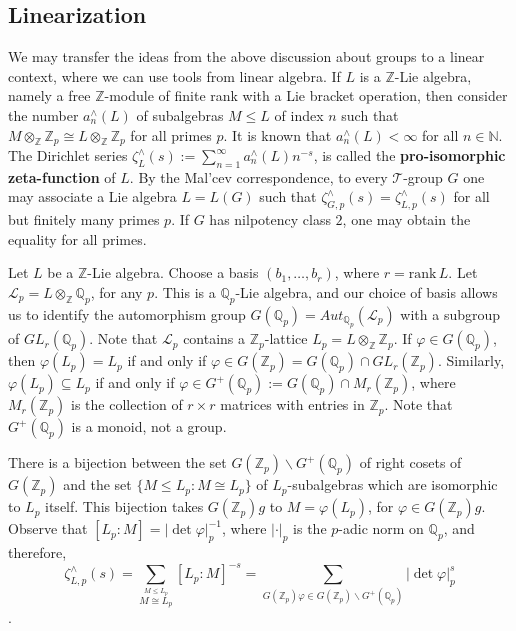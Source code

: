 \documentclass[12pt]{article}
\begin{document}
\subsection{Linearization}
We may transfer the ideas from the above discussion about groups to a linear context, where we can use tools from linear algebra.
If $L$ is a $\mathbb{Z}$-Lie algebra, namely a free $\mathbb{Z}$-module of finite rank with a Lie bracket operation, then consider the number $a_{n}^{\wedge}(L)$ of subalgebras $M\leq L$ of index $n$ such that $M\otimes_{\mathbb{Z}}\mathbb{Z}_p\cong L\otimes_{\mathbb{Z}}\mathbb{Z}_p$ for all primes $p$. It is known that $a_{n}^{\wedge}(L)<\infty$ for all $n\in\mathbb{N}$. The Dirichlet series $\zeta_{L}^{\wedge}(s):=\sum_{n=1}^{\infty}{a_{n}^{\wedge}}(L)n^{-s}$, is called the \textbf{pro-isomorphic zeta-function} of $L$. By the Mal'cev correspondence, to every $\mathcal{T}$-group $G$ one may associate a Lie algebra $L=L(G)$ such that $\zeta_{G,p}^{\wedge}(s)=\zeta_{L,p}^{\wedge}(s)$ for all but finitely many primes $p$. If $G$ has nilpotency class $2$, one may obtain the equality for all primes.\par
Let $L$ be a $\mathbb{Z}$-Lie algebra. Choose a basis $(b_1,\dots,b_r)$, where $r=\mathrm{rank}\,L$. Let $\mathcal{L}_{p}=L\otimes_{\mathbb{Z}}\mathbb{Q}_p$, for any $p$. This is a $\mathbb{Q}_p$-Lie algebra, and our choice of basis allows us to identify the automorphism group $G(\mathbb{Q}_p)=Aut_{\mathbb{Q}_p}(\mathcal{L}_{p})$ with a subgroup of $GL_r(\mathbb{Q}_p)$. Note that $\mathcal{L}_{p}$ contains a $\mathbb{Z}_p$-lattice $L_{p}=L\otimes_{\mathbb{Z}}\mathbb{Z}_p$. If $\varphi\in G(\mathbb{Q}_p)$, then $\varphi(L_{p})=L_{p}$ if and only if $\varphi\in G(\mathbb{Z}_p)=G(\mathbb{Q}_p)\cap GL_r(\mathbb{Z}_p)$. Similarly, $\varphi(L_{p})\subseteq L_{p}$ if and only if $\varphi\in G^{+}(\mathbb{Q}_p):=G(\mathbb{Q}_p)\cap {M}_r(\mathbb{Z}_p)$, where ${M}_r(\mathbb{Z}_p)$ is the collection of $r\times r$ matrices with entries in $\mathbb{Z}_p$. Note that $G^{+}(\mathbb{Q}_p)$ is a monoid, not a group.\par
There is a bijection between the set $G(\mathbb{Z}_p)\backslash G^{+}(\mathbb{Q}_p)$ of right cosets of $G(\mathbb{Z}_p)$ and the set $\{M\leq L_{p} : M\cong L_{p}\}$ of $L_{p}$-subalgebras which are isomorphic to $L_{p}$ itself. This bijection takes $G(\mathbb{Z}_p)g$ to $M=\varphi(L_{p})$, for $\varphi\in G(\mathbb{Z}_p)g$.
Observe that $[L_{p}:M]=|\det\varphi|_p^{-1}$, where $|\cdot|_p$ is the $p$-adic norm on $\mathbb{Q}_{p}$, and therefore,
\begin{equation}
\label{equation.proisomorphic.zeta}
\zeta_{L,p}^{\wedge}(s)=\underset{\overset{\scriptscriptstyle M\leq L_{p}}{\scriptscriptstyle M\cong L_{p}}}{\sum}[L_{p}:M]^{-s}=\underset{\scriptscriptstyle G(\mathbb{Z}_p)\varphi\in G(\mathbb{Z}_p)\backslash G^{+}(\mathbb{Q}_p)}{\sum}|\det\varphi|_p^s
\end{equation}.
\end{document}
